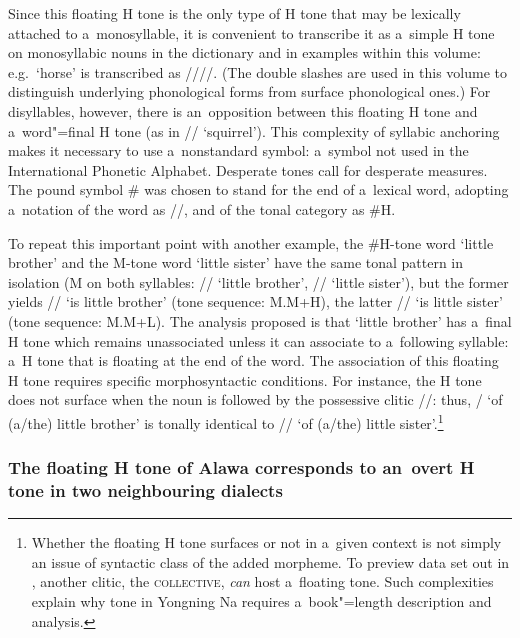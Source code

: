Since this floating H tone is the only type of H tone that may be lexically attached to
a~{monosyllable}, it is convenient to transcribe it as a~simple H tone on monosyllabic nouns in the
dictionary and in examples within this volume: e.g.~‘horse’ is transcribed as ////. (The double slashes are used in this volume to distinguish underlying phonological forms from surface phonological ones.) For
disyllables, however, there is an~opposition between this floating H tone and a~word"=final H tone
(as in // ‘squirrel’). This complexity of syllabic {anchoring} makes it necessary to use
a~nonstandard symbol: a~symbol not used in the International Phonetic Alphabet. Desperate tones call
for desperate measures. The pound symbol \# was chosen to stand for the end of
a~lexical word, adopting a~notation of the word as //, and of the tonal category as \#H.

To repeat this important point with another example, the \#H-tone word ‘little brother’ and the
M-tone word ‘little sister’ have the same tonal pattern in isolation (M on both syllables: //
‘little brother’, // ‘little sister’), but the former yields // ‘is little
brother’ (tone sequence: M.M+H), the latter // ‘is little sister’ (tone sequence:
M.M+L). The analysis proposed is that ‘little brother’ has a~final H tone which remains unassociated
unless it can associate to a~following syllable: a~H tone that is floating at the end of the
word. The association of this floating H tone requires specific morphosyntactic conditions. For
instance, the H tone does not surface when the noun is followed by the {possessive} clitic //: thus, / ‘of \mbox{(a/the)} little brother’ is tonally identical to //
‘of \mbox{(a/the)} little sister’.\footnote{Whether the floating H tone surfaces or not in a~given context is not simply an issue of syntactic class of the added morpheme. To preview data set out in , another clitic, the \textsc{collective}, \textit{can} host a~floating tone. Such complexities explain why tone in Yongning Na requires a~book"=length description and analysis.}


\subsubsection[The floating tone corresponds to an~overt H in neighbouring dialects]{The floating H tone of Alawa corresponds to an~overt H tone in two neighbouring dialects}
\label{sec:thefloatinghtoneofyongningnacorrespondstoanoverthtoneinneighbouringdialects}


